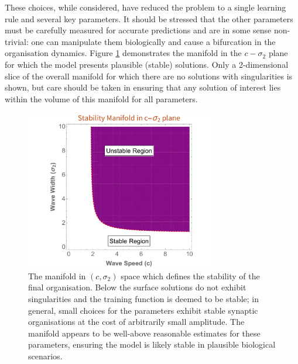 These choices, while considered, have reduced the problem to a single learning rule and several key parameters. It should be stressed that the other parameters must be carefully measured for accurate predictions and are in some sense non-trivial: one can manipulate them biologically and cause a bifurcation in the organisation dynamics. Figure \ref{fig:stablity} demonstrates the manifold in the $c-\sigma_2$ plane for which the model presents plausible (stable) solutions. Only a 2-dimensional slice of the overall manifold for which there are no solutions with singularities is shown, but care should be taken in ensuring that any solution of interest lies within the volume of this manifold for all parameters.
\begin{figure}
	\centering
	\includegraphics[width=0.75\textwidth]{images/nft_activity/stabilitysurface}
	\def\c{The manifold in $(c,\sigma_2)$ space which defines the stability of the final organisation. }
	\caption[\c]{\label{fig:stablity} \c Below the surface solutions do not exhibit singularities and the training function is deemed to be stable; in general, small choices for the parameters exhibit stable synaptic organisations at the cost of arbitrarily small amplitude. The manifold appears to be well-above reasonable estimates for these parameters, ensuring the model is likely stable in plausible biological scenarios.} 
\end{figure}
